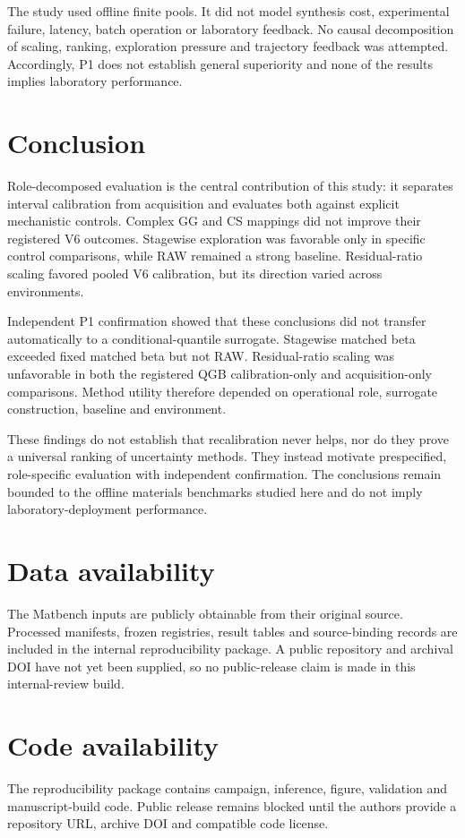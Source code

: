 \documentclass[10pt,twocolumn]{article}
\begin{document}
The study used offline finite pools. It did not model synthesis cost, experimental failure, latency, batch operation or laboratory feedback. No causal decomposition of scaling, ranking, exploration pressure and trajectory feedback was attempted. Accordingly, P1 does not establish general superiority and none of the results implies laboratory performance.
\section{Conclusion}
Role-decomposed evaluation is the central contribution of this study: it separates interval calibration from acquisition and evaluates both against explicit mechanistic controls. Complex GG and CS mappings did not improve their registered V6 outcomes. Stagewise exploration was favorable only in specific control comparisons, while RAW remained a strong baseline. Residual-ratio scaling favored pooled V6 calibration, but its direction varied across environments.

Independent P1 confirmation showed that these conclusions did not transfer automatically to a conditional-quantile surrogate. Stagewise matched beta exceeded fixed matched beta but not RAW. Residual-ratio scaling was unfavorable in both the registered QGB calibration-only and acquisition-only comparisons. Method utility therefore depended on operational role, surrogate construction, baseline and environment.

These findings do not establish that recalibration never helps, nor do they prove a universal ranking of uncertainty methods. They instead motivate prespecified, role-specific evaluation with independent confirmation. The conclusions remain bounded to the offline materials benchmarks studied here and do not imply laboratory-deployment performance.
\section*{Data availability}
The Matbench inputs are publicly obtainable from their original source. Processed manifests, frozen registries, result tables and source-binding records are included in the internal reproducibility package. A public repository and archival DOI have not yet been supplied, so no public-release claim is made in this internal-review build.

\section*{Code availability}
The reproducibility package contains campaign, inference, figure, validation and manuscript-build code. Public release remains blocked until the authors provide a repository URL, archive DOI and compatible code license.
\end{document}
